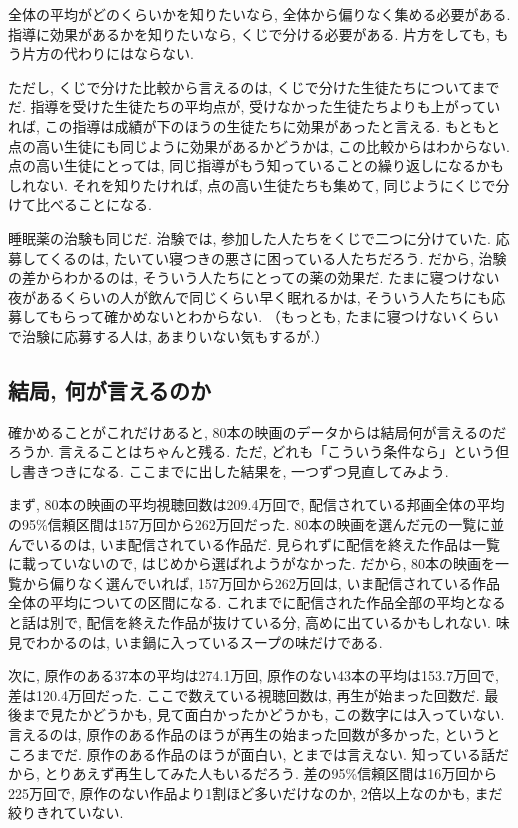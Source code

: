     全体の平均がどのくらいかを知りたいなら, 全体から偏りなく集める必要がある.
    指導に効果があるかを知りたいなら, くじで分ける必要がある.
    片方をしても, もう片方の代わりにはならない.

    ただし, くじで分けた比較から言えるのは, くじで分けた生徒たちについてまでだ.
    指導を受けた生徒たちの平均点が, 受けなかった生徒たちよりも上がっていれば, この指導は成績が下のほうの生徒たちに効果があったと言える.
    もともと点の高い生徒にも同じように効果があるかどうかは, この比較からはわからない.
    点の高い生徒にとっては, 同じ指導がもう知っていることの繰り返しになるかもしれない.
    それを知りたければ, 点の高い生徒たちも集めて, 同じようにくじで分けて比べることになる.

    睡眠薬の治験も同じだ.
    治験では, 参加した人たちをくじで二つに分けていた.
    応募してくるのは, たいてい寝つきの悪さに困っている人たちだろう.
    だから, 治験の差からわかるのは, そういう人たちにとっての薬の効果だ.
    たまに寝つけない夜があるくらいの人が飲んで同じくらい早く眠れるかは, そういう人たちにも応募してもらって確かめないとわからない.
    （もっとも, たまに寝つけないくらいで治験に応募する人は, あまりいない気もするが.）

  \subsection{結局, 何が言えるのか}

    確かめることがこれだけあると, 80本の映画のデータからは結局何が言えるのだろうか.
    言えることはちゃんと残る.
    ただ, どれも「こういう条件なら」という但し書きつきになる.
    ここまでに出した結果を, 一つずつ見直してみよう.

    まず, 80本の映画の平均視聴回数は209.4万回で, 配信されている邦画全体の平均の95\%信頼区間は157万回から262万回だった.
    80本の映画を選んだ元の一覧に並んでいるのは, いま配信されている作品だ.
    見られずに配信を終えた作品は一覧に載っていないので, はじめから選ばれようがなかった.
    だから, 80本の映画を一覧から偏りなく選んでいれば, 157万回から262万回は, いま配信されている作品全体の平均についての区間になる.
    これまでに配信された作品全部の平均となると話は別で, 配信を終えた作品が抜けている分, 高めに出ているかもしれない.
    味見でわかるのは, いま鍋に入っているスープの味だけである.

    次に, 原作のある37本の平均は274.1万回, 原作のない43本の平均は153.7万回で, 差は120.4万回だった.
    ここで数えている視聴回数は, 再生が始まった回数だ.
    最後まで見たかどうかも, 見て面白かったかどうかも, この数字には入っていない.
    言えるのは, 原作のある作品のほうが再生の始まった回数が多かった, というところまでだ.
    原作のある作品のほうが面白い, とまでは言えない.
    知っている話だから, とりあえず再生してみた人もいるだろう.
    差の95\%信頼区間は16万回から225万回で, 原作のない作品より1割ほど多いだけなのか, 2倍以上なのかも, まだ絞りきれていない.

